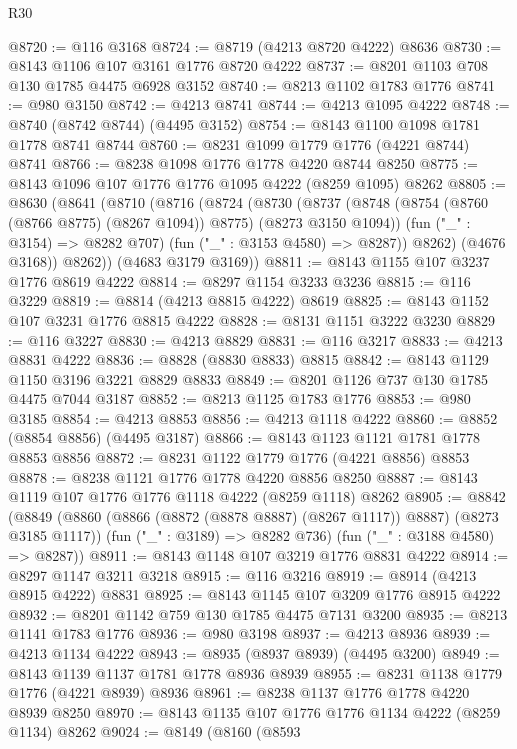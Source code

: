 \begin{lexlean}{R30}
\begin{coremodule}
@8720 := @116 @3168
@8724 := @8719 (@4213 @8720 @4222) @8636
@8730 := @8143 @1106 @107 @3161 @1776 @8720 @4222
@8737 := @8201 @1103 @708 @130 @1785 @4475 @6928 @3152
@8740 := @8213 @1102 @1783 @1776
@8741 := @980 @3150
@8742 := @4213 @8741
@8744 := @4213 @1095 @4222
@8748 := @8740 (@8742 @8744) (@4495 @3152)
@8754 := @8143 @1100 @1098 @1781 @1778 @8741 @8744
@8760 := @8231 @1099 @1779 @1776 (@4221 @8744) @8741
@8766 := @8238 @1098 @1776 @1778 @4220 @8744 @8250
@8775 := @8143 @1096 @107 @1776 @1776 @1095 @4222 (@8259 @1095) @8262
@8805 := @8630
    (@8641
      (@8710
        (@8716
          (@8724
            (@8730
              (@8737
                (@8748 (@8754 (@8760 (@8766 @8775) (@8267 @1094)) @8775) (@8273 @3150 @1094))
                (fun ("_" : @3154) => @8282 @707)
                (fun ("_" : @3153 @4580) => @8287))
              @8262)
            (@4676 @3168))
          @8262))
      (@4683 @3179 @3169))
@8811 := @8143 @1155 @107 @3237 @1776 @8619 @4222
@8814 := @8297 @1154 @3233 @3236
@8815 := @116 @3229
@8819 := @8814 (@4213 @8815 @4222) @8619
@8825 := @8143 @1152 @107 @3231 @1776 @8815 @4222
@8828 := @8131 @1151 @3222 @3230
@8829 := @116 @3227
@8830 := @4213 @8829
@8831 := @116 @3217
@8833 := @4213 @8831 @4222
@8836 := @8828 (@8830 @8833) @8815
@8842 := @8143 @1129 @1150 @3196 @3221 @8829 @8833
@8849 := @8201 @1126 @737 @130 @1785 @4475 @7044 @3187
@8852 := @8213 @1125 @1783 @1776
@8853 := @980 @3185
@8854 := @4213 @8853
@8856 := @4213 @1118 @4222
@8860 := @8852 (@8854 @8856) (@4495 @3187)
@8866 := @8143 @1123 @1121 @1781 @1778 @8853 @8856
@8872 := @8231 @1122 @1779 @1776 (@4221 @8856) @8853
@8878 := @8238 @1121 @1776 @1778 @4220 @8856 @8250
@8887 := @8143 @1119 @107 @1776 @1776 @1118 @4222 (@8259 @1118) @8262
@8905 := @8842
    (@8849
      (@8860 (@8866 (@8872 (@8878 @8887) (@8267 @1117)) @8887) (@8273 @3185 @1117))
      (fun ("_" : @3189) => @8282 @736)
      (fun ("_" : @3188 @4580) => @8287))
@8911 := @8143 @1148 @107 @3219 @1776 @8831 @4222
@8914 := @8297 @1147 @3211 @3218
@8915 := @116 @3216
@8919 := @8914 (@4213 @8915 @4222) @8831
@8925 := @8143 @1145 @107 @3209 @1776 @8915 @4222
@8932 := @8201 @1142 @759 @130 @1785 @4475 @7131 @3200
@8935 := @8213 @1141 @1783 @1776
@8936 := @980 @3198
@8937 := @4213 @8936
@8939 := @4213 @1134 @4222
@8943 := @8935 (@8937 @8939) (@4495 @3200)
@8949 := @8143 @1139 @1137 @1781 @1778 @8936 @8939
@8955 := @8231 @1138 @1779 @1776 (@4221 @8939) @8936
@8961 := @8238 @1137 @1776 @1778 @4220 @8939 @8250
@8970 := @8143 @1135 @107 @1776 @1776 @1134 @4222 (@8259 @1134) @8262
@9024 := @8149
    (@8160
      (@8593

\end{coremodule}
\end{lexlean}
